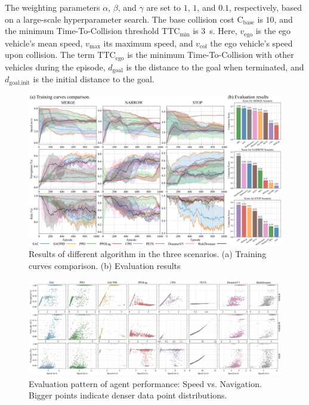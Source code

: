 The weighting parameters $\alpha$, $\beta$, and $\gamma$ are set to $1$, $1$, and $0.1$, respectively, based on a large-scale hyperparameter search.
The base collision cost $\mathrm{C}_{\text{base}}$ is $10$, and the minimum Time-To-Collision threshold $\text{TTC}_{\min}$ is \SI{3}{\second}.
Here, $v_{\text{ego}}$ is the ego vehicle's mean speed, $v_{\text{max}}$ its maximum speed, and $v_{\text{col}}$ the ego vehicle's speed upon collision.
The term $\text{TTC}_{\text{ego}}$ is the minimum Time-To-Collision with other vehicles during the episode, $d_{\text{goal}}$ is the distance to the goal when terminated, and $d_{\text{goal,init}}$ is the initial distance to the goal.







\begin{figure}[!htbp]
    \centering
    \includegraphics[width=\textwidth]{fig/train_curve.png}
    \caption{Results of different algorithm in the three scenarios. (a) Training curves comparison. (b) Evaluation results}
    \label{fig:train_curve}
\end{figure}


\begin{figure}[!htbp]
    \centering
    \includegraphics[width=\textwidth]{fig/algo_scatter_compare.png}
    \caption{Evaluation pattern of agent performance: Speed vs. Navigation. Bigger points indicate denser data point distributions.}
    \label{fig:eval}
\end{figure}


